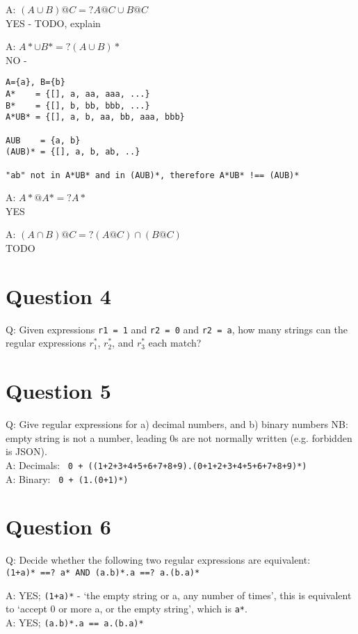 \documentclass[english]{scrartcl}
\begin{document}
A: $(A \cup B)@C =? A@C \cup B@C$ \\
YES - TODO, explain

A: $A* \cup B* =? (A \cup B)*$ \\
NO -
\begin{verbatim}
A={a}, B={b}
A*    = {[], a, aa, aaa, ...}
B*    = {[], b, bb, bbb, ...}
A*UB* = {[], a, b, aa, bb, aaa, bbb}

AUB    = {a, b}
(AUB)* = {[], a, b, ab, ..}

"ab" not in A*UB* and in (AUB)*, therefore A*UB* !== (AUB)*

\end{verbatim}

A: $A*@A* =? A*$ \\
YES

A: $(A \cap B)@C =? (A@C)\cap(B@C)$ \\
TODO

\section*{Question 4}
Q: Given expressions \verb|r1 = 1| and \verb|r2 = 0| and \verb|r2 = a|,
how many strings can the regular expressions $r_1^*$, $r_2^*$, and $r_3^*$ each match?

\section*{Question 5}
Q: Give regular expressions for a) decimal numbers, and b) binary numbers
NB: empty string is not a number, leading 0s are not normally written (e.g. forbidden is JSON).\\

A: Decimals: \verb~ 0 + ((1+2+3+4+5+6+7+8+9).(0+1+2+3+4+5+6+7+8+9)*) ~ \\
A: Binary: \verb~ 0 + (1.(0+1)*) ~

\section*{Question 6}
Q: Decide whether the following two regular expressions are equivalent: \\
\verb|(1+a)* ==? a* AND (a.b)*.a ==? a.(b.a)*|

A: YES; \verb|(1+a)*| - `the empty string or a, any number of times', this is equivalent to `accept 0 or more a, or the empty string', which is \verb~a*~. \\
A: YES; \verb|(a.b)*.a == a.(b.a)*|
\end{document}
